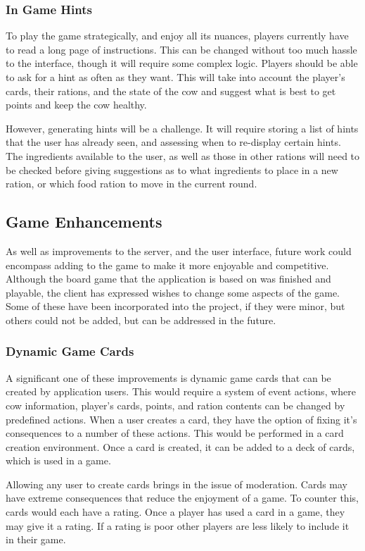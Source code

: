 \subsubsection{In Game Hints}
To play the game strategically, and enjoy all its nuances, players currently have to read a long page of instructions. This can be changed without too much hassle to the interface, though it will require some complex logic. Players should be able to ask for a hint as often as they want. This will take into account the player's cards, their rations, and the state of the cow and suggest what is best to get points and keep the cow healthy.

However, generating hints will be a challenge. It will require storing a list of hints that the user has already seen, and assessing when to re-display certain hints. The ingredients available to the user, as well as those in other rations will need to be checked before giving suggestions as to what ingredients to place in a new ration, or which food ration to move in the current round.

\subsection{Game Enhancements}
As well as improvements to the server, and the user interface, future work could encompass adding to the game to make it more enjoyable and competitive. Although the board game that the application is based on was finished and playable, the client has expressed wishes to change some aspects of the game. Some of these have been incorporated into the project, if they were minor, but others could not be added, but can be addressed in the future.

\subsubsection{Dynamic Game Cards}
A significant one of these improvements is dynamic game cards that can be created by application users. This would require a system of event actions, where cow information, player's cards, points, and ration contents can be changed by predefined actions. When a user creates a card, they have the option of fixing it's consequences to a number of these actions. This would be performed in a card creation environment. Once a card is created, it can be added to a deck of cards, which is used in a game.

Allowing any user to create cards brings in the issue of moderation. Cards may have extreme consequences that reduce the enjoyment of a game. To counter this, cards would each have a rating. Once a player has used a card in a game, they may give it a rating. If a rating is poor other players are less likely to include it in their game.


